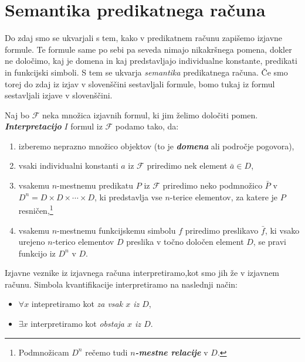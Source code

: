 \documentclass[11pt]{book}
\def\Fcal{\mathcal{F}}
\def\definicija{\color{rdeca}\bf\em}
\theoremstyle{definition}
\theoremstyle{zgled}
\theoremstyle{odprtproblem}
\theoremstyle{domacanaloga}
\theoremstyle{izrek}
\begin{document}
\section{Semantika predikatnega računa}

Do zdaj smo se ukvarjali s tem, kako v predikatnem računu zapišemo izjavne formule. Te formule same po sebi pa seveda nimajo nikakršnega pomena, dokler ne določimo, kaj je domena in kaj predstavljajo individualne konstante, predikati in funkcijski simboli. S tem se ukvarja \emph{semantika} predikatnega računa. Če smo torej do zdaj iz izjav v slovenščini sestavljali formule, bomo tukaj iz formul sestavljali izjave v slovenščini.

Naj bo $\Fcal$ neka množica izjavnih formul, ki jim želimo določiti pomen. {\definicija Interpretacijo} $I$ formul iz $\Fcal$ podamo tako, da:
\begin{enumerate}
    \item izberemo neprazno množico objektov (to je {\definicija domena} ali področje pogovora),
    \item vsaki individualni konstanti $a$ iz $\Fcal$ priredimo nek element $\bar a \in D$,
    \item vsakemu $n$-mestnemu predikatu $P$ iz $\Fcal$ priredimo neko podmnožico $\bar P$ v $D^n = D \times D \times \cdots \times D$, ki  predstavlja vse $n$-terice elementov, za katere je $P$ resničen,\footnote{Podmnožicam $D^n$ rečemo tudi {\definicija $n$-mestne relacije} v $D$.}
    \item vsakemu $n$-mestnemu funkcijskemu simbolu $f$ priredimo preslikavo $\bar f$, ki vsako urejeno $n$-terico elementov $D$ preslika v točno določen element $D$, se pravi funkcijo iz $D^n$ v $D$.
\end{enumerate}

Izjavne veznike iz izjavnega računa interpretiramo,kot smo jih že v izjavnem računu. Simbola kvantifikacije interpretiramo na naslednji način:
\begin{itemize}
    \item $\forall x$ intepretiramo kot \emph{za vsak $x$ iz $D$},
    \item $\exists x$ interpretiramo kot \emph{obstaja $x$ iz $D$}.
\end{itemize}
\end{document}
